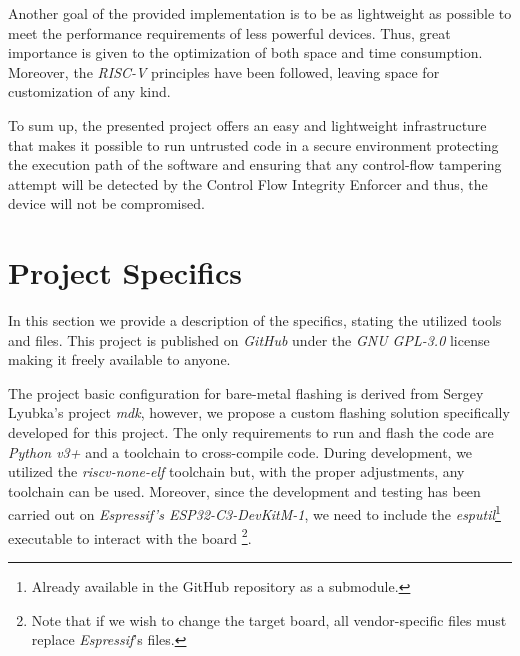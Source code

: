 Another goal of the provided implementation is to be as lightweight as possible to
meet the performance requirements of less powerful devices. Thus, great importance
is given to the optimization of both space and time consumption. Moreover, the \textit{RISC-V}
principles have been followed, leaving space for customization of any kind.

To sum up, the presented project offers an easy and lightweight infrastructure
that makes it possible to run untrusted code in a secure environment protecting
the execution path of the software and ensuring that any control-flow tampering
attempt will be detected by the Control Flow Integrity Enforcer and thus, the device
will not be compromised.

\section{Project Specifics}
\label{sec:project_specifics}

In this section we provide a description of the specifics, stating the utilized tools
and files. This project is published on \textit{GitHub}\cite{repo} under the
\textit{GNU GPL-3.0} license\cite{gpl3} making it freely available to anyone.

The project basic configuration for bare-metal flashing is derived from Sergey
Lyubka's project \textit{mdk}\cite{mdk}, however, we propose a custom flashing
solution specifically developed for this project. The only requirements to run and
flash the code are \textit{Python v3+} and a toolchain to cross-compile code. During
development, we utilized the \textit{riscv-none-elf}\cite{toolchain} toolchain
but, with the proper adjustments, any toolchain can be used. Moreover, since the
development and testing has been carried out on \textit{Espressif's ESP32-C3-DevKitM-1}\cite{esp32c3},
we need to include the \textit{esputil}\footnote{Already available in the GitHub
repository as a submodule\cite{esputil}.} executable to interact with the board \footnote{Note
that if we wish to change the target board, all vendor-specific files must replace
\textit{Espressif}'s files.}.

